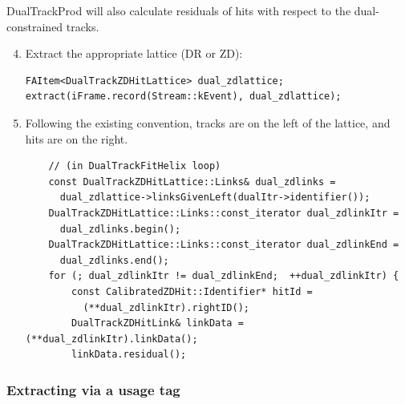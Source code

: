 \documentclass[12pt]{article}
\begin{document}
DualTrackProd will also calculate residuals of hits with respect to
the dual-constrained tracks.
\begin{enumerate}\setcounter{enumi}{3}

  \item Extract the appropriate lattice (DR or ZD):
\begin{verbatim}FAItem<DualTrackZDHitLattice> dual_zdlattice;
extract(iFrame.record(Stream::kEvent), dual_zdlattice); \end{verbatim}

  \item Following the existing convention, tracks are on the left of
  the lattice, and hits are on the right.
\begin{verbatim}    // (in DualTrackFitHelix loop)
    const DualTrackZDHitLattice::Links& dual_zdlinks =
      dual_zdlattice->linksGivenLeft(dualItr->identifier());
    DualTrackZDHitLattice::Links::const_iterator dual_zdlinkItr =
      dual_zdlinks.begin();
    DualTrackZDHitLattice::Links::const_iterator dual_zdlinkEnd =
      dual_zdlinks.end();
    for (; dual_zdlinkItr != dual_zdlinkEnd;  ++dual_zdlinkItr) {
        const CalibratedZDHit::Identifier* hitId =
          (**dual_zdlinkItr).rightID();
        DualTrackZDHitLink& linkData = (**dual_zdlinkItr).linkData();
        linkData.residual();\end{verbatim}

\end{enumerate}

\subsubsection{Extracting via a usage tag}
\end{document}

